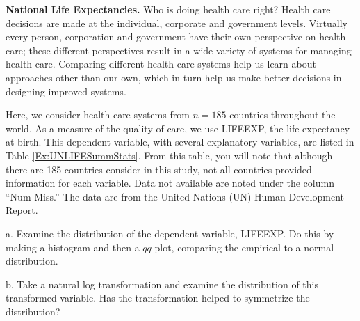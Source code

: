 \begin{exercises}
\item \textbf{National Life Expectancies.}\label{Ex:UNLIFE} Who is doing health care right?
Health care decisions are made at the individual, corporate and
government levels. Virtually every person, corporation and
government have their own perspective on health care; these
different perspectives result in a wide variety of systems for
managing health care. Comparing different health care systems help
us learn about approaches other than our own, which in turn help us
make better decisions in designing improved systems.

Here, we consider health care systems from $n=185$ countries
throughout the world. As a measure of the quality of care, we use
LIFEEXP, the life expectancy at birth. This dependent variable, with
several explanatory variables, are listed in Table
\ref{Ex:UNLIFESummStats}. From this table, you will note that
although there are 185 countries consider in this study, not all
countries provided information for each variable. Data not available
are noted under the column ``Num Miss.'' The data are from the
United Nations (UN) Human Development Report.

a. Examine the distribution of the dependent variable, LIFEEXP. Do
this by making a histogram and then a $qq$ plot, comparing the
empirical to a normal distribution.

b. Take a natural log transformation and examine the distribution of
this transformed variable. Has the transformation helped to
symmetrize the distribution?




\end{exercises}
